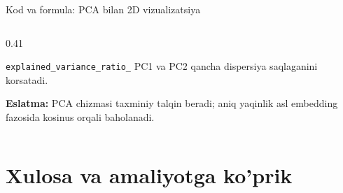 \documentclass[aspectratio=169,11pt]{beamer}
\begin{document}
\begin{frame}[fragile]{Kod va formula: PCA bilan 2D vizualizatsiya}
\begin{columns}[T,totalwidth=\textwidth]
\begin{column}{0.41\textwidth}
\vspace{4pt}

\begin{tcolorbox}[defbox,left=2mm,right=2mm,top=1mm,bottom=1mm]
\scriptsize
\texttt{explained\_variance\_ratio\_} PC1 va PC2 qancha dispersiya
saqlaganini ko\textquotesingle{}rsatadi.
\end{tcolorbox}

\vspace{3pt}
\scriptsize
\textbf{Eslatma:} PCA chizmasi taxminiy talqin beradi; aniq yaqinlik
asl embedding fazosida kosinus orqali baholanadi.

\end{column}
\end{columns}

\end{frame}

\section[Xulosa]{Xulosa va amaliyotga ko'prik}
\end{document}
